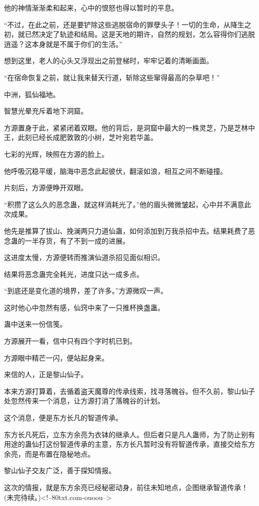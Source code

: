\begin{this_body}
他的神情渐渐柔和起来，心中的恨怒也得以暂时的平息。

“不过，在此之前，还是要铲除这些逃脱宿命的罪孽头子！一切的生命，从降生之初，就已然决定了轨迹和结局。这是天地的期许，自然的规划，怎么容得你们逃脱逍遥？这本身就是不属于你们的生活。”

想到这里，老人的心头又浮现出之前登梯时，牢牢记着的清晰画面。

“在宿命恢复之前，就让我来替天行道，斩除这些窜得最高的杂草吧！”

中洲，狐仙福地。

智慧光晕充斥着地下洞窟。

方源置身于此，紧紧闭着双眼。他的背后，是洞窟中最大的一株灵芝，乃是芝林中王，此刻已经长成肥敦敦的小树，芝叶宛若华盖。

七彩的光辉，映照在方源的脸上。

他呼吸沉稳平缓，脑海中恶念此起彼伏，翻滚如浪，相互之间不断碰撞。

片刻后，方源便睁开双眼。

“积攒了这么久的恶念蛊，就这样消耗光了。”他的眉头微微皱起，心中并不满意此次成果。

他先是推算了拔山、挽澜两只力道仙蛊，如何添加到万我杀招中去。结果耗费了恶念蛊的一半存货，有了不到一成的进展。

这进度太慢，方源便转而推演仙道杀招见面似相识。

结果将恶念蛊完全耗光，进度只达一成多点。

“到底还是变化道的境界，差了许多。”方源微叹一声。

这时他心中忽然有感，仙窍中来了一只推杯换盏蛊。

蛊中送来一份信笺。

方源展开一看，信中只有四个字时机已到。

方源眼中精芒一闪，便站起身来。

来信的人，正是黎山仙子。

本来方源打算着，去循着盗天魔尊的传承线索，找寻落魄谷。但不久前，黎山仙子处忽然传来一个消息，让方源打消了落魄谷的计划。

这个消息，便是东方长凡的智道传承。

东方长凡死后，立东方余亮为衣钵的继承人。但后者只是凡人蛊师，为了防止别有用途的蛊仙打这份智道传承的主意，东方长凡暂时没有将智道传承，直接交给东方余亮，而是布置在隐秘地点。

黎山仙子交友广泛，善于探知情报。

这次的情报，就是东方余亮已经秘密动身，前往未知地点，企图继承智道传承！(未完待续。)<!--80txt.com-ouoou-->

\end{this_body}

